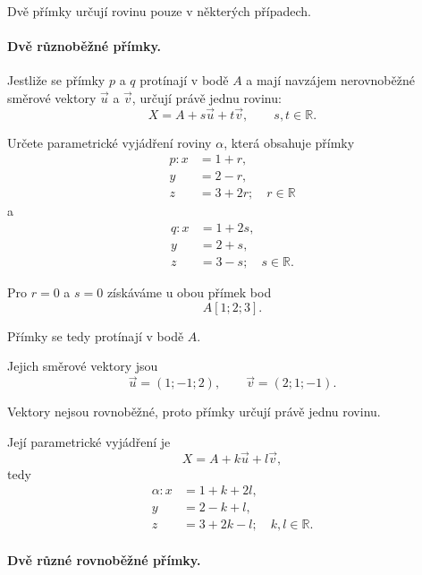 Dvě přímky určují rovinu pouze v některých případech.

\paragraph{Dvě různoběžné přímky.}

Jestliže se přímky $p$ a $q$ protínají v bodě $A$ a mají navzájem
nerovnoběžné směrové vektory $\vec{u}$ a $\vec{v}$, určují právě
jednu rovinu:
\[
    X=A+s\vec{u}+t\vec{v},
    \qquad
    s,t\in\mathbb{R}.
\]

\begin{example}
    \label{exa:Plane_two_intersecting_lines}

    Určete parametrické vyjádření roviny $\alpha$, která obsahuje
    přímky
    \[
        \begin{aligned}
            p: x&=1+r,\\
            y&=2-r,\\
            z&=3+2r; \quad r\in\mathbb{R}
        \end{aligned}
    \]
    a
    \[
        \begin{aligned}
            q: x&=1+2s,\\
            y&=2+s,\\
            z&=3-s; \quad s\in\mathbb{R}.
        \end{aligned}
    \]

    Pro $r=0$ a $s=0$ získáváme u obou přímek bod
    \[
        A[1;2;3].
    \]

    Přímky se tedy protínají v bodě $A$.

    Jejich směrové vektory jsou
    \[
        \vec{u}=(1;-1;2),
        \qquad
        \vec{v}=(2;1;-1).
    \]

    Vektory nejsou rovnoběžné, proto přímky určují právě jednu rovinu.

    Její parametrické vyjádření je
    \[
        X=A+k\vec{u}+l\vec{v},
    \]
    tedy
    \[
        \begin{aligned}
            \alpha: x&=1+k+2l,\\
            y&=2-k+l,\\
            z&=3+2k-l; \quad k,l\in\mathbb{R}.
        \end{aligned}
    \]
\end{example}

\paragraph{Dvě různé rovnoběžné přímky.}

